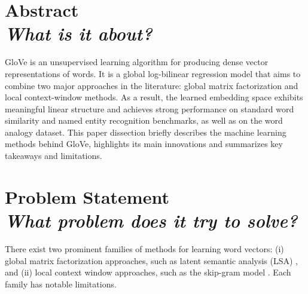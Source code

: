 \documentclass[10pt,a4paper]{article}
\begin{document}
\thispagestyle{firstpage}


\renewcommand{\refname}{\textbf{References}}

\section{\textbf{Abstract} \\ \textit{What is it about?}}
GloVe is an unsupervised learning algorithm for producing dense vector representations of words. It is a global log-bilinear regression model that aims to combine two major approaches in the literature: global matrix factorization and local context-window methods. As a result, the learned embedding space exhibits meaningful linear structure and achieves strong performance on standard word similarity and named entity recognition benchmarks, as well as on the word analogy dataset. This paper dissection briefly describes the machine learning methods behind GloVe, highlights its main innovations and summarizes key takeaways and limitations.

\section{\textbf{Problem Statement} \\ \textit{What problem does it try to solve?}}
There exist two prominent families of methods for learning word vectors: (i) global matrix factorization approaches, such as latent semantic analysis (LSA) \cite{deerwester1990}, and (ii) local context window approaches, such as the skip-gram model \cite{mikolov2013efficient}. Each family has notable limitations.
\end{document}
